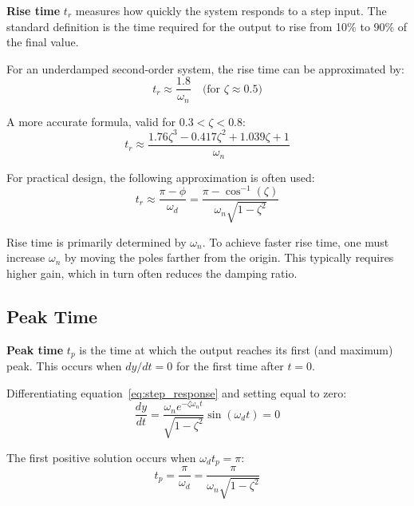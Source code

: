 \textbf{Rise time} $t_r$ measures how quickly the system responds to a step input. The standard definition is the time required for the output to rise from 10\% to 90\% of the final value.

For an underdamped second-order system, the rise time can be approximated by:
\begin{equation}
    \boxed{t_r \approx \frac{1.8}{\omega_n} \quad \text{(for } \zeta \approx 0.5\text{)}}
    \label{eq:rise_time_approx}
\end{equation}

A more accurate formula, valid for $0.3 < \zeta < 0.8$:
\begin{equation}
    t_r \approx \frac{1.76\zeta^3 - 0.417\zeta^2 + 1.039\zeta + 1}{\omega_n}
\end{equation}

For practical design, the following approximation is often used:
\begin{equation}
    t_r \approx \frac{\pi - \phi}{\omega_d} = \frac{\pi - \cos^{-1}(\zeta)}{\omega_n\sqrt{1-\zeta^2}}
\end{equation}

\begin{keyconceptbox}
Rise time is primarily determined by $\omega_n$. To achieve faster rise time, one must increase $\omega_n$ by moving the poles farther from the origin. This typically requires higher gain, which in turn often reduces the damping ratio.
\end{keyconceptbox}

\subsection{Peak Time}

\textbf{Peak time} $t_p$ is the time at which the output reaches its first (and maximum) peak. This occurs when $dy/dt = 0$ for the first time after $t = 0$.

Differentiating equation~\eqref{eq:step_response} and setting equal to zero:
\begin{equation}
    \frac{dy}{dt} = \frac{\omega_n e^{-\zeta\omega_n t}}{\sqrt{1-\zeta^2}}\sin(\omega_d t) = 0
\end{equation}

The first positive solution occurs when $\omega_d t_p = \pi$:
\begin{equation}
    \boxed{t_p = \frac{\pi}{\omega_d} = \frac{\pi}{\omega_n\sqrt{1-\zeta^2}}}
    \label{eq:peak_time}
\end{equation}

